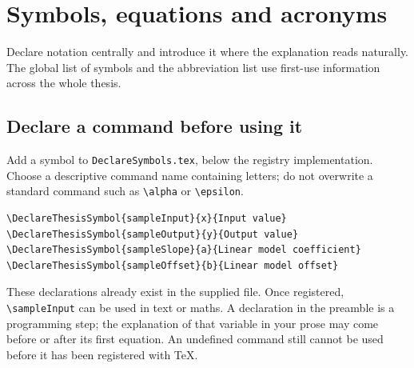 
\chapter{Symbols, equations and acronyms}\label{chap:04}
\renewcommand{\FigLocation}{Chapters/Chapter_4/fig/}
\renewcommand{\ChapLocation}{Chapters/Chapter_4/}
\begin{absbox}
Declare notation centrally and introduce it where the explanation reads naturally. The global list of symbols and the abbreviation list use first-use information across the whole thesis.
\end{absbox}

\section{Declare a command before using it}
Add a symbol to \texttt{DeclareSymbols.tex}, below the registry implementation.
Choose a descriptive command name containing letters; do not overwrite a
standard command such as \verb|\alpha| or \verb|\epsilon|.
\begin{lstlisting}
\DeclareThesisSymbol{sampleInput}{x}{Input value}
\DeclareThesisSymbol{sampleOutput}{y}{Output value}
\DeclareThesisSymbol{sampleSlope}{a}{Linear model coefficient}
\DeclareThesisSymbol{sampleOffset}{b}{Linear model offset}
\end{lstlisting}
These declarations already exist in the supplied file. Once registered,
\verb|\sampleInput| can be used in text or maths. A declaration in the preamble
is a programming step; the explanation of that variable in your prose may
come before or after its first equation. An undefined command still cannot be
used before it has been registered with TeX.

